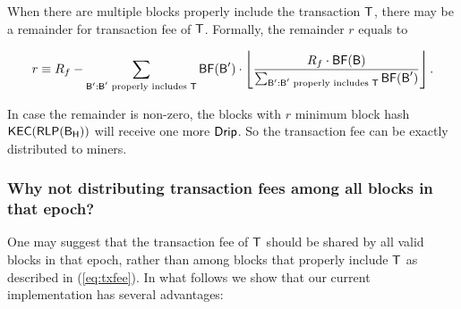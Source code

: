 When there are multiple blocks properly include the transaction $\textsf{T}$, there may be a remainder for transaction fee of $\textsf{T}$. Formally, the remainder $r$ equals to

\begin{align}
	r\equiv R_f - \sum_{\textsf{B}': \text{$\textsf{B}'$ properly includes $\textsf{T}$}} \mathsf{BF}(\textsf{B}') \cdot \left\lfloor\frac{R_f \cdot\mathsf{BF}(\textsf{B})}{\sum_{\textsf{B}': \text{$\textsf{B}'$ properly includes $\textsf{T}$}} \mathsf{BF}(\textsf{B}') }\right\rfloor.
\end{align}

In case the remainder is non-zero, the blocks with $r$ minimum block hash $\mathsf{KEC}(\mathsf{RLP}(\textsf{B}_{\textsf{H}}))$ will receive one more ${\sf Drip}$. So the transaction fee can be exactly distributed to miners. 


\subsubsection{Why not distributing transaction fees among all blocks in that epoch?}
	One may suggest that the transaction fee of $\textsf{T}$ should be shared by all valid blocks in that epoch, rather than among blocks that properly include $\textsf{T}$ as described in (\ref{eq:txfee}).
	In what follows we show that our current implementation has several advantages:
